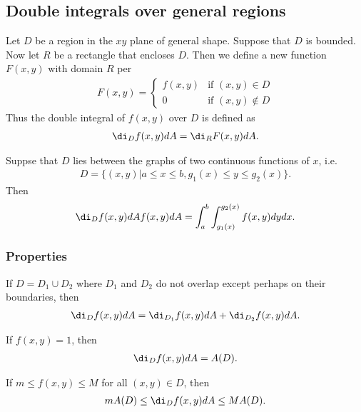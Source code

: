 \documentclass{article}
\begin{document}
\subsection{Double integrals over general regions}


\begin{definition}
    Let $D$ be a region in the $xy$ plane of general shape.
    Suppose that $D$ is bounded. Now let $R$ be a rectangle that
    encloses $D$. Then we define a new function $F(x,y)$
    with domain $R$ per
    \begin{align*}
        F(x,y)=\begin{cases}
            f(x,y) &\text{if } (x,y)\in D\\
            0      &\text{if } (x,y)\not\in D
        \end{cases}
    \end{align*}
    Thus the double integral of $f(x,y)$ over $D$ is defined as
    \begin{align*}
        \di_D f(x,y)dA = \di_R F(x,y)dA.
    \end{align*}
\end{definition}
\begin{theorem}
    Suppse that $D$ lies between the graphs of two continuous
    functions of $x$, i.e.
    \begin{align*}
        D = \{(x,y) | a \leq x \leq b, g_1(x)\leq y\leq g_2(x)\}.
    \end{align*}
    Then
    \begin{align*}
        \di_D f(x,y)dA f(x,y)dA = \int_a^ b \int_{g_1(x)}^{g_2(x)} f(x,y)dy dx.
    \end{align*}
\end{theorem}

\subsubsection{Properties}

\begin{theorem}
    If $D=D_1\cup D_2$ where $D_1$ and $D_2$ do not overlap
    except perhaps on their boundaries, then
    \begin{align*}
        \di_D f(x,y) dA = \di_{D_1} f(x,y)dA + \di_{D_2}f(x,y)dA.
    \end{align*}
\end{theorem}
\begin{theorem}
    If $f(x,y)=1$, then 
    \begin{align*}
        \di_D f(x,y)dA = A(D).
    \end{align*}
\end{theorem}
\begin{theorem}
    If $m\leq f(x,y) \leq M$ for all $(x,y)\in D$, then
    \begin{align*}
        mA(D) \leq \di_D f(x,y) dA \leq MA(D).
    \end{align*}
\end{theorem}
\end{document}
